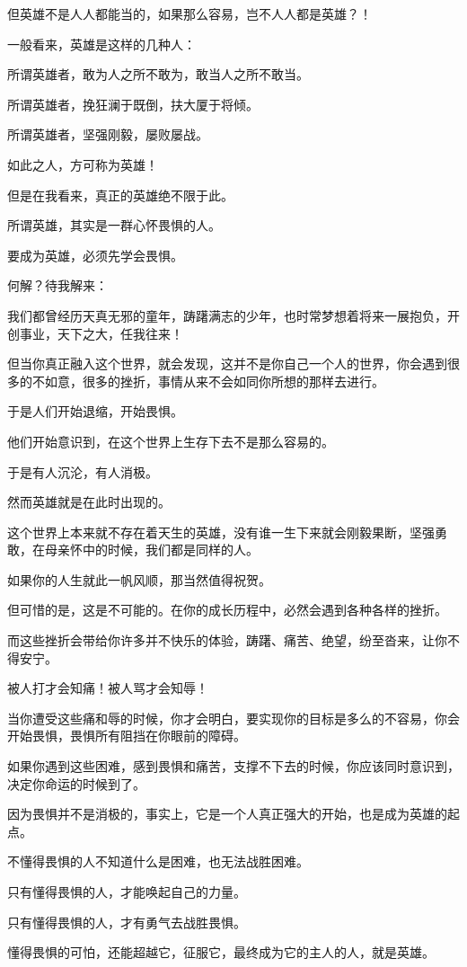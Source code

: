 \begin{multicols}{\theparacolNo}
但英雄不是人人都能当的，如果那么容易，岂不人人都是英雄？！

一般看来，英雄是这样的几种人：

所谓英雄者，敢为人之所不敢为，敢当人之所不敢当。

所谓英雄者，挽狂澜于既倒，扶大厦于将倾。

所谓英雄者，坚强刚毅，屡败屡战。

如此之人，方可称为英雄！

但是在我看来，真正的英雄绝不限于此。

所谓英雄，其实是一群心怀畏惧的人。

要成为英雄，必须先学会畏惧。

何解？待我解来：

我们都曾经历天真无邪的童年，踌躇满志的少年，也时常梦想着将来一展抱负，开创事业，天下之大，任我往来！

但当你真正融入这个世界，就会发现，这并不是你自己一个人的世界，你会遇到很多的不如意，很多的挫折，事情从来不会如同你所想的那样去进行。

于是人们开始退缩，开始畏惧。

他们开始意识到，在这个世界上生存下去不是那么容易的。

于是有人沉沦，有人消极。

然而英雄就是在此时出现的。

这个世界上本来就不存在着天生的英雄，没有谁一生下来就会刚毅果断，坚强勇敢，在母亲怀中的时候，我们都是同样的人。

如果你的人生就此一帆风顺，那当然值得祝贺。

但可惜的是，这是不可能的。在你的成长历程中，必然会遇到各种各样的挫折。

而这些挫折会带给你许多并不快乐的体验，踌躇、痛苦、绝望，纷至沓来，让你不得安宁。

被人打才会知痛！被人骂才会知辱！

当你遭受这些痛和辱的时候，你才会明白，要实现你的目标是多么的不容易，你会开始畏惧，畏惧所有阻挡在你眼前的障碍。

如果你遇到这些困难，感到畏惧和痛苦，支撑不下去的时候，你应该同时意识到，决定你命运的时候到了。

因为畏惧并不是消极的，事实上，它是一个人真正强大的开始，也是成为英雄的起点。

不懂得畏惧的人不知道什么是困难，也无法战胜困难。

只有懂得畏惧的人，才能唤起自己的力量。

只有懂得畏惧的人，才有勇气去战胜畏惧。

懂得畏惧的可怕，还能超越它，征服它，最终成为它的主人的人，就是英雄。


\end{multicols}

